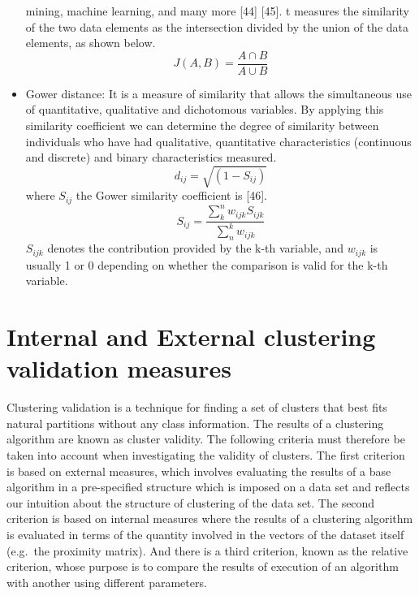 \documentclass[
]{article}
\begin{document}
\begin{itemize}
  mining, machine learning, and many more {[}44{]} {[}45{]}. t measures
  the similarity of the two data elements as the intersection divided by
  the union of the data elements, as shown below. \begin{equation}
        J(A,B) = \frac{A \cap B}{A \cup B}
    \end{equation}
\item
  Gower distance: It is a measure of similarity that allows the
  simultaneous use of quantitative, qualitative and dichotomous
  variables. By applying this similarity coefficient we can determine
  the degree of similarity between individuals who have had qualitative,
  quantitative characteristics (continuous and discrete) and binary
  characteristics measured. \begin{equation}
        d_{ij}=\sqrt{(1-S_{ij})}
    \end{equation} where \(S_{ij}\) the Gower similarity coefficient is
  {[}46{]}. \begin{equation}
        S_{ij}=\frac{\sum_{k}^{n}w_{ijk}S_{ijk}}{\sum_{n}^{k}w_{ijk}}
    \end{equation} \(S_{ijk}\) denotes the contribution provided by the
  k-th variable, and \(w_{ijk}\) is usually 1 or 0 depending on whether
  the comparison is valid for the k-th variable.
\end{itemize}

\hypertarget{internal-and-external-clustering-validation-measures}{%
\section{\texorpdfstring{Internal and External clustering validation
measures
\label{sec:seccion2}}{Internal and External clustering validation measures }}\label{internal-and-external-clustering-validation-measures}}

Clustering validation is a technique for finding a set of clusters that
best fits natural partitions without any class information. The results
of a clustering algorithm are known as cluster validity. The following
criteria must therefore be taken into account when investigating the
validity of clusters. The first criterion is based on external measures,
which involves evaluating the results of a base algorithm in a
pre-specified structure which is imposed on a data set and reflects our
intuition about the structure of clustering of the data set. The second
criterion is based on internal measures where the results of a
clustering algorithm is evaluated in terms of the quantity involved in
the vectors of the dataset itself (e.g.~the proximity matrix). And there
is a third criterion, known as the relative criterion, whose purpose is
to compare the results of execution of an algorithm with another using
different parameters.
\end{document}
